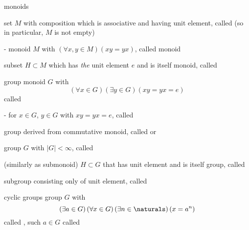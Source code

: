 \documentclass[17pt,landscape]{foils}
\begin{document}
{\vfill

\begin{mydefinition}{monoids}%

	set $M$ with composition which is associative and having unit element,
	called 
	(so in particular, $M$ is not empty)
	\ibit
	\item [-]
		monoid $M$ with
		$
			\left(
				\forall x, y \in M
			\right)
			\left(
				xy = yx
			\right)
		$,
		called  monoid%

	\vitem [-]
		subset $H\subset M$ which has \emph{the} unit element $e$ and is itself monoid,
		called %
	\eit
\end{mydefinition}



\begin{mydefinition}{group}
	monoid $G$ with
	$$
		\left(
			\forall x \in G
		\right)
		\left(
			\exists y \in G
		\right)
		\left(
			xy = yx = e
		\right)
	$$
	called 
	\ibit
	\item [-]
		for $x\in G$, $y\in G$ with $xy=yx=e$,
		called %

	\vitem [-]
		group derived from commutative monoid,
		called  or %
			\

	\vitem [-]
		group $G$ with $|G|<\infty$,
		called %

	\vitem [-]
		(similarly as submonoid)
		$H\subset G$ that has unit element and is itself group,
		called 

	\vitem [-]
		subgroup consisting only of unit element, called %
	\eit
\end{mydefinition}



\begin{mydefinition}{cyclic groups}%
	group $G$ with
	$$
		\left(
			\exists a\in G
		\right)
		\left(
			\forall x \in G
		\right)
		\left(
			\exists n\in \naturals
		\right)
		\left(
			x = a^n
		\right)
	$$
	called %
		,
	such $a\in G$ called %
\end{mydefinition}

}
\end{document}
